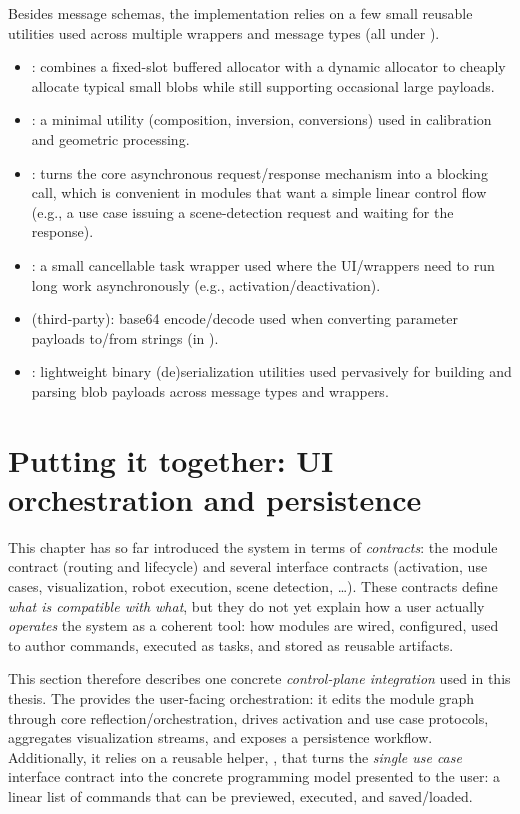Besides message schemas, the implementation relies on a few small reusable utilities used across multiple wrappers and message types (all under ).
\begin{itemize}
    \item {}: combines a fixed-slot buffered allocator with a dynamic allocator to cheaply allocate typical small blobs while still supporting occasional large payloads.
    \item {}: a minimal  utility (composition, inversion, conversions) used in calibration and geometric processing.
    \item {}: turns the core asynchronous request/response mechanism into a blocking call, which is convenient in modules that want a simple linear control flow (e.g., a use case issuing a scene-detection request and waiting for the response).
    \item {}: a small cancellable task wrapper used where the UI/wrappers need to run long work asynchronously (e.g., activation/deactivation).
    \item {} (third-party): base64 encode/decode used when converting  parameter payloads to/from strings (in ).
    \item {}: lightweight binary (de)serialization utilities used pervasively for building and parsing blob payloads across message types and wrappers.
\end{itemize}



\section{Putting it together: UI orchestration and persistence} \label{sec:ch3_putting_it_together}

This chapter has so far introduced the system in terms of \emph{contracts}: the module contract (routing and lifecycle) and several interface contracts (activation, use cases, visualization, robot execution, scene detection, \dots). These contracts define \emph{what is compatible with what}, but they do not yet explain how a user actually \emph{operates} the system as a coherent tool: how modules are wired, configured, used to author commands, executed as tasks, and stored as reusable artifacts.

This section therefore describes one concrete \emph{control-plane integration} used in this thesis. The  provides the user-facing orchestration: it edits the module graph through core reflection/orchestration, drives activation and use case protocols, aggregates visualization streams, and exposes a persistence workflow. Additionally, it relies on a reusable helper, , that turns the \emph{single use case} interface contract into the concrete programming model presented to the user: a linear list of commands that can be previewed, executed, and saved/loaded.


